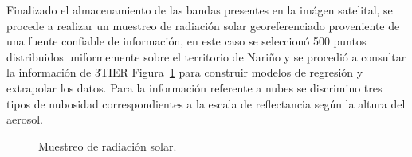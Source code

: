 Finalizado el almacenamiento de las bandas presentes en la imágen satelital, se procede a realizar un muestreo de radiación solar georeferenciado 
proveniente de una fuente confiable de información, en este caso  se seleccionó 500 puntos distribuidos uniformemente sobre el territorio 
de Nariño y se procedió a consultar la información de 3TIER Figura~\ref{fig:m3t} para construir modelos de regresión y 
extrapolar los datos. Para la información referente a nubes se discrimino tres tipos de nubosidad correspondientes a la escala de 
reflectancia\cite{li2003high} según la altura del aerosol.
\begin{figure}[htb]
  \centering
  \hspace{5mm}
  \caption{Muestreo de radiación solar.}
  \label{fig:m3t}
\end{figure}
\newpage

